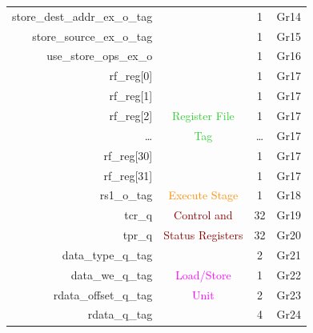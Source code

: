 \begin{table}[t]
\begin{tabular}{@{}rccc@{}}
        store\_dest\_addr\_ex\_o\_tag   &                                       & 1      & Gr14                        \\
        store\_source\_ex\_o\_tag       &                                       & 1      & Gr15                        \\
        use\_store\_ops\_ex\_o          &                                       & 1      & Gr16                        \\\hdashline
        rf\_reg[0]                      &                                       & 1      & Gr17                        \\
        rf\_reg[1]                      &                                       & 1      & Gr17                        \\
        rf\_reg[2]                      & \textcolor{LimeGreen}{Register File}  & 1      & Gr17                        \\
        \ldots                          & \textcolor{LimeGreen}{Tag}            & \ldots & Gr17                        \\
        rf\_reg[30]                     &                                       & 1      & Gr17                        \\
        rf\_reg[31]                     &                                       & 1      & Gr17                        \\\hdashline
        rs1\_o\_tag                     & \textcolor{DarkOrange}{Execute Stage} & 1      & Gr18                        \\\hdashline
        tcr\_q                          & \textcolor{DarkRed}{Control and}      & 32     & Gr19                        \\
        tpr\_q                          & \textcolor{DarkRed}{Status Registers} & 32     & Gr20                        \\\hdashline
        data\_type\_q\_tag              &                                       & 2      & Gr21                        \\
        data\_we\_q\_tag                & \textcolor{magenta}{Load/Store}       & 1      & Gr22                        \\
        rdata\_offset\_q\_tag           & \textcolor{magenta}{Unit}             & 2      & Gr23                        \\
        rdata\_q\_tag                   &                                       & 4      & Gr24                        \\
        \bottomrule
    \end{tabular}
\end{table}


